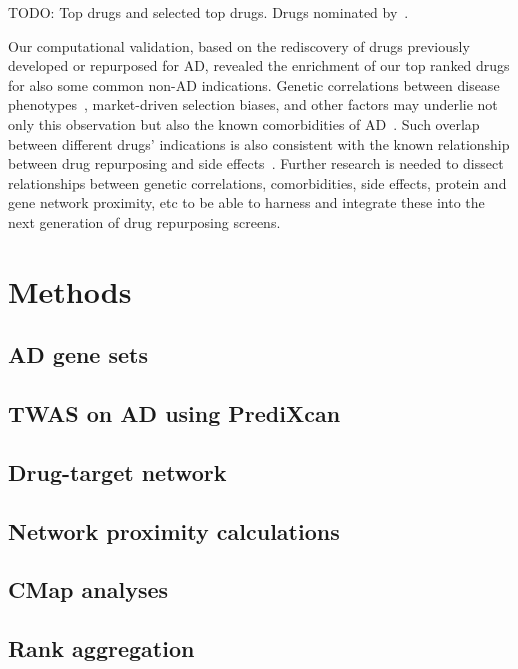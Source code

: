 \documentclass[letterpaper]{article}
\begin{document}
TODO: Top drugs and selected top drugs.  Drugs nominated
by~\cite{Fang2021,Taubes2021}.

Our computational validation, based on the rediscovery of drugs previously
developed or repurposed for AD, revealed the enrichment of our top ranked
drugs for also some common non-AD indications.  Genetic correlations between
disease phenotypes~\citep{Consortium2018}, market-driven selection biases, and
other factors may underlie not only this observation but also the known
comorbidities of AD~\citep{Santiago2021}.  Such overlap between different
drugs' indications is also consistent with the known relationship between drug
repurposing and side effects~\citep{Ye2014}.  Further research is needed to
dissect relationships between genetic correlations, comorbidities, side
effects, protein and gene network proximity, etc to be able to harness and
integrate these into the next generation of drug repurposing screens.

\section{Methods}

\subsection{AD gene sets}

\subsection{TWAS on AD using PrediXcan}

\subsection{Drug-target network}

\subsection{Network proximity calculations}

\subsection{CMap analyses}

\subsection{Rank aggregation}
\end{document}
